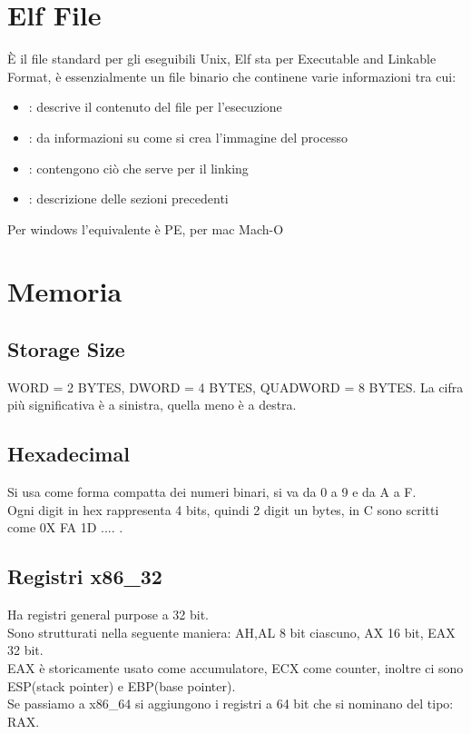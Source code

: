 \documentclass[oneside,a4paper,11pt]{book}
\theoremstyle{italicstyle}
\theoremstyle{normStyle}
\begin{document}
\section{Elf File}
È il file standard per gli eseguibili Unix, Elf sta per Executable and Linkable Format, è essenzialmente un file binario che continene varie informazioni tra cui:
\begin{itemize}
	\item {}: descrive il contenuto del file per l'esecuzione
	\item {}: da informazioni su come si crea l'immagine del processo
	\item {}: contengono ciò che serve per il linking
	\item {}: descrizione delle sezioni precedenti 
\end{itemize}
Per windows l'equivalente è PE, per mac Mach-O
\section{Memoria}
\subsection{Storage Size}
WORD = 2 BYTES, DWORD = 4 BYTES, QUADWORD = 8 BYTES.
La cifra più significativa è a sinistra, quella meno è a destra.
\subsection{Hexadecimal}
Si usa come forma compatta dei numeri binari, si va da 0 a 9 e da A a F.\\
Ogni digit in hex rappresenta 4 bits, quindi 2 digit un bytes, in C sono scritti come 0X FA 1D .... .
\subsection{Registri x86_32}
Ha registri general purpose a 32 bit.\\
Sono strutturati nella seguente maniera: AH,AL 8 bit ciascuno, AX 16 bit, EAX 32 bit.\\
EAX è storicamente usato come accumulatore, ECX come counter, inoltre ci sono ESP(stack pointer) e EBP(base pointer).\\
Se passiamo a x86_64 si aggiungono i registri a 64 bit che si nominano del tipo: RAX.
\end{document}
